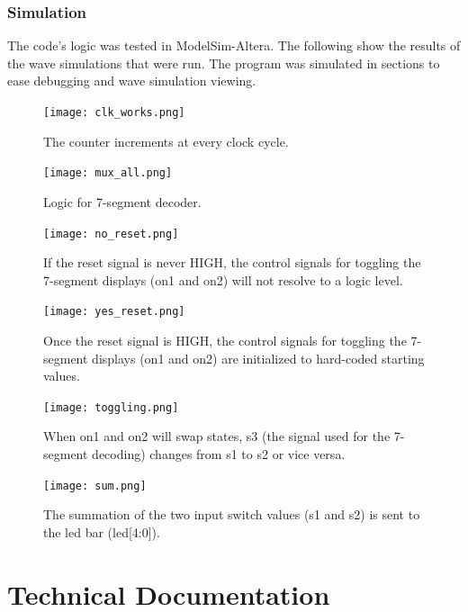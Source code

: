 \documentclass[11pt]{article}
\begin{document}
\subsubsection{Simulation}

The code's logic was tested in ModelSim-Altera. The following show the results of the wave simulations that were run. The program was simulated in sections to ease debugging and wave simulation viewing.

\begin{figure}[h!]
\centering
\texttt{[image: clk\_works.png]}
\caption{The counter increments at every clock cycle.}
\label{fig:wave_clk}
\end{figure} 


\begin{figure}[h!]
\centering
\texttt{[image: mux\_all.png]}
\caption{Logic for 7-segment decoder.}
\label{fig:wave_mux}
\end{figure} 


\begin{figure}[h!]
\centering
\texttt{[image: no\_reset.png]}
\caption{If the reset signal is never HIGH, the control signals for toggling the 7-segment displays (on1 and on2) will not resolve to a logic level.}
\label{fig:wave_reset_no}
\end{figure} 


\begin{figure}[h!]
\centering
\texttt{[image: yes\_reset.png]}
\caption{Once the reset signal is HIGH, the control signals for toggling the 7-segment displays (on1 and on2) are initialized to hard-coded starting values.}
\label{fig:wave_reset_yes}
\end{figure}


\begin{figure}[h!]
\centering
\texttt{[image: toggling.png]}
\caption{When on1 and on2 will swap states, s3 (the signal used for the 7-segment decoding) changes from s1 to s2 or vice versa.}
\label{fig:wave_toggle}
\end{figure}


\begin{figure}[h!]
\centering
\texttt{[image: sum.png]}
\caption{The summation of the two input switch values (s1 and s2) is sent to the led bar (led[4:0]).}
\label{fig:wave_sum}
\end{figure}


\clearpage

\section{Technical Documentation}
\end{document}
